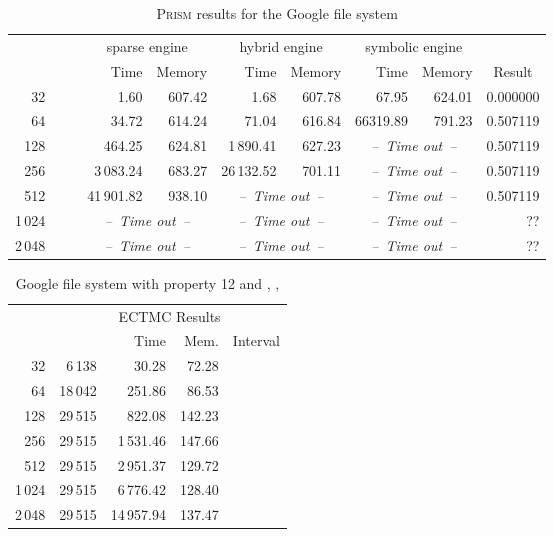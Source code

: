 \documentclass[10pt,twocolumn]{article}
\newcommand{\PRISM}{\textsc{Prism}\xspace}
\newcommand{\timelimit}{\emph{--~Time out~--}}
\begin{document}
\begin{table*}
  \centering
  \caption{\PRISM results for the Google file system}
  \label{tab:google_detailed_prism}
\begin{tabular}{|rrr|rr|rr|rr|r|}
  \hline
    &&  & \multicolumn{2}{c|}{sparse engine} & \multicolumn{2}{c|}{hybrid engine} & \multicolumn{2}{c|}{symbolic engine} & \\
   & \multicolumn{1}{c}{} & \multicolumn{1}{c|}{} & Time & Memory & Time & Memory & Time & Memory & \multicolumn{1}{c|}{Result} \\
  \hline
  32  &  &  & 1.60 & 607.42 & 1.68 & 607.78 & 67.95 & 624.01 & 0.000000 \\
  64  &  &  & 34.72 & 614.24 & 71.04 & 616.84 & 66319.89 & 791.23 & 0.507119\\
  128 &  &  & 464.25 & 624.81 & 1\,890.41 & 627.23 & \multicolumn{2}{c|}{\timelimit} & 0.507119 \\
  256 &  &  & 3\,083.24 & 683.27 & 26\,132.52 & 701.11 & \multicolumn{2}{c|}{\timelimit} & 0.507119 \\
  512 &  &  & 41\,901.82 & 938.10 & \multicolumn{2}{c|}{\timelimit} & \multicolumn{2}{c|}{\timelimit} & 0.507119 \\
  1\,024 &  &  & \multicolumn{2}{c|}{\timelimit} & \multicolumn{2}{c|}{\timelimit} & \multicolumn{2}{c|}{\timelimit} & ?? \\
  2\,048 &  &  & \multicolumn{2}{c|}{\timelimit} & \multicolumn{2}{c|}{\timelimit} & \multicolumn{2}{c|}{\timelimit} & ?? \\
  \hline
\end{tabular}
\end{table*}

\begin{table}[tb]
  \centering
  \caption{\label{tab:google}Google file system with property 12 and , , }
\begin{tabular}{|r|rrrc|}
\hline
     & \multicolumn{4}{c|}{ECTMC Results} \\
  &  & Time & Mem. & Interval \\
\hline
32 & 6\,138 & 30.28 & 72.28 &  \\
64 & 18\,042 & 251.86 & 86.53 &  \\
128 & 29\,515 & 822.08 & 142.23 &  \\
256 & 29\,515 & 1\,531.46 & 147.66 &  \\
512 & 29\,515 & 2\,951.37 & 129.72 &  \\
1\,024 & 29\,515 & 6\,776.42 & 128.40 &  \\
2\,048 & 29\,515 & 14\,957.94 & 137.47 &  \\
\hline
\end{tabular}
\end{table}
\end{document}
